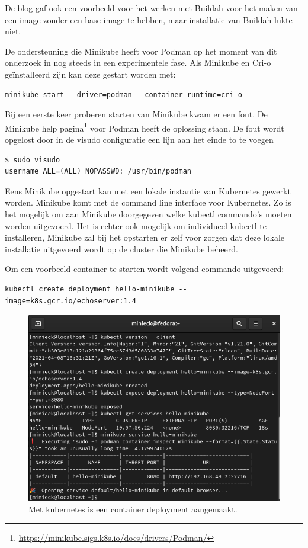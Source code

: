 De blog gaf ook een voorbeeld voor het werken met Buildah voor het maken van een image zonder een base image te hebben, maar installatie van Buildah lukte niet.

De ondersteuning die Minikube heeft voor Podman op het moment van dit onderzoek in nog steeds in een experimentele fase. Als Minikube en Cri-o geïnstalleerd zijn kan deze gestart worden met:
\begin{verbatim}
minikube start --driver=podman --container-runtime=cri-o
\end{verbatim}
Bij een eerste keer proberen starten van Minikube kwam er een fout. De Minikube help pagina\footnote{\url{https://minikube.sigs.k8s.io/docs/drivers/Podman/}} voor Podman heeft de oplossing staan. De fout wordt opgelost door in de visudo configuratie een lijn aan het einde to te voegen
\begin{verbatim}
$ sudo visudo
username ALL=(ALL) NOPASSWD: /usr/bin/podman
\end{verbatim}

Eens Minikube opgestart kan met een lokale instantie van Kubernetes gewerkt worden. Minikube komt met de command line interface voor Kubernetes. Zo is het mogelijk om aan Minikube doorgegeven welke kubectl commando’s moeten worden uitgevoerd. Het is echter ook mogelijk om individueel kubectl te installeren, Minikube zal bij het opstarten er zelf voor zorgen dat deze lokale installatie uitgevoerd wordt op de cluster die Minikube beheerd.

Om een voorbeeld container te starten wordt volgend commando uitgevoerd:
\begin{verbatim}
kubectl create deployment hello-minikube --image=k8s.gcr.io/echoserver:1.4
\end{verbatim}
\begin{figure}[h]
    \includegraphics[width=\linewidth]{img/hellokube.png}
    \caption[Het opstarten van een contianer met kubectl]{Met kubernetes is een container deployment aangemaakt.}
    \label{fig:hellokube}
    \centering
\end{figure}

